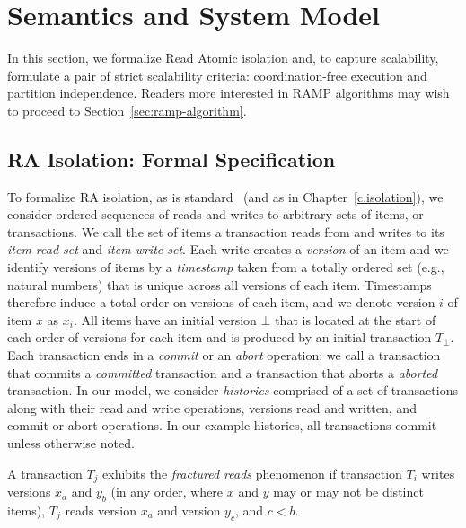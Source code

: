 \section{Semantics and System Model}
\label{sec:ra-def}

In this section, we formalize Read Atomic isolation and, to capture
scalability, formulate a pair of strict scalability criteria:
coordination-free execution and partition independence. Readers more interested in
RAMP algorithms may wish to proceed to Section~\ref{sec:ramp-algorithm}.

\subsection{RA Isolation: Formal Specification}
\label{sec:ra-spec}

To formalize RA isolation, as is standard~\cite{adya,bernstein-book} (and as in
Chapter~\ref{c.isolation}), we consider
ordered sequences of reads and writes to arbitrary sets of items, or
transactions. We call the set of items a transaction reads from and
writes to its \textit{item read set} and \textit{item write set}. Each
write creates a \textit{version} of an item and we identify versions
of items by a \textit{timestamp} taken from a totally ordered set
(e.g., natural numbers) that is unique across all versions of each
item. Timestamps therefore induce a total order on versions of each
item, and we denote version $i$ of item $x$ as $x_i$. All items have
an initial version $\bot$ that is located at the start of each order
of versions for each item and is produced by an initial transaction
$T_\bot$. Each transaction ends in a \textit{commit} or an
\textit{abort} operation; we call a transaction that commits a
\textit{committed} transaction and a transaction that aborts a
\textit{aborted} transaction. In our model, we consider
\textit{histories} comprised of a set of transactions along with their
read and write operations, versions read and written, and commit or
abort operations. In our example histories, all transactions commit
unless otherwise noted.

\begin{definition}
  A transaction $T_j$ exhibits the \textit{fractured reads} phenomenon
  if transaction $T_i$ writes versions $x_a$ and $y_b$ (in any order,
  where $x$ and $y$ may or may not be distinct items), $T_j$ reads
  version $x_a$ and version $y_c$, and $c < b$.
\end{definition}

